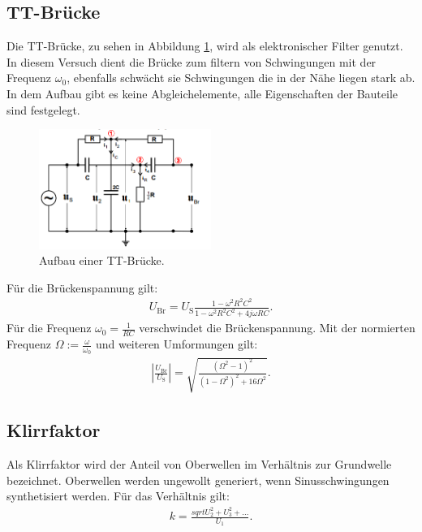 \subsection{TT-Brücke}
Die TT-Brücke, zu sehen in Abbildung \ref{fig:tt}, wird als elektronischer Filter genutzt.
In diesem Versuch dient die Brücke zum filtern von Schwingungen mit der Frequenz $\omega_0$, ebenfalls schwächt sie Schwingungen die in der Nähe liegen stark ab.
In dem Aufbau gibt es keine Abgleichelemente, alle Eigenschaften der Bauteile sind festgelegt.
\begin{figure}
 \centering
 \includegraphics[width=0.5\textwidth]{tt.PNG}
 \caption{Aufbau einer TT-Brücke.\cite{sample}}
 \label{fig:tt}
 \end{figure}
Für die Brückenspannung gilt:
\begin{align}
  U_\mathrm{Br}=U_\mathrm{S}\frac{1-\omega^2 R^2 C^2}{1-\omega^2 R^2 C^2 + 4j \omega R C}\label{eqn:ubr}.
\end{align}
Für die Frequenz $\omega_0=\frac{1}{RC}$ verschwindet die Brückenspannung.
Mit der normierten Frequenz $\Omega:=\frac{\omega}{\omega_0}$ und weiteren Umformungen gilt:
\begin{align}
  \left|\frac{U_\mathrm{Br}}{U_\mathrm{S}}\right|=\sqrt{\frac{\left(\Omega^2-1\right)^2}{\left(1-\Omega^2\right)^2+16\Omega^2}}\label{eqn:TT}.
\end{align}
\subsection{Klirrfaktor}
Als Klirrfaktor wird der Anteil von Oberwellen im Verhältnis zur Grundwelle bezeichnet. Oberwellen werden ungewollt generiert, wenn Sinusschwingungen synthetisiert werden.
Für das Verhältnis gilt:
\begin{align}
  k=\frac{sqrt{U_2^2+U_3^2+...}}{U_1}\label{eqn:klirr}.
\end{align}
